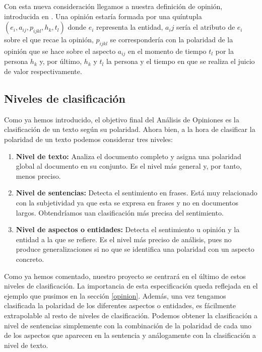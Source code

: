 	Con esta nueva consideración llegamos a nuestra definición de opinión, introducida en \cite{liu}. Una opinión estaría formada por una quíntupla $(e_i, a_{ij}, p_{ijkl}, h_{k}, t_{l})$ donde $e_i$ representa la entidad, $a_ij$ sería el atributo de $e_i$ sobre el que recae la opinión, $p_{ijkl}$ se correspondería con la polaridad de la opinión que se hace sobre el aspecto $a_{ij}$ en el momento de tiempo $t_{l}$ por la persona $h_{k}$ y, por último, $h_{k}$ y $t_{l}$ la persona y el tiempo en que se realiza el juicio de valor respectivamente.
		 
		
	\subsection{Niveles de clasificación}\label{nivelesSA}
	
	
	Como ya hemos introducido, el objetivo final del Análisis de Opiniones es la clasificación de un texto según su polaridad. Ahora bien, a la hora de clasificar la polaridad de un texto podemos considerar tres niveles:
	
	\begin{enumerate}
		\item \textbf{Nivel de texto: } Analiza el documento completo y asigna una polaridad global al documento en su conjunto. Es el nivel más general y, por tanto, menos preciso.
		\item \textbf{Nivel de sentencias: } Detecta el sentimiento en frases. Está muy relacionado con la subjetividad ya que esta se expresa en frases y no en documentos largos. Obtendríamos uan clasificación más precisa del sentimiento.
		\item \textbf{Nivel de aspectos o entidades: } Detecta el sentimiento u opinión y la entidad a la que se refiere. Es el nivel más preciso de análisis, pues no produce generalizaciones si no que se identifica una polaridad con un aspecto concreto.
	\end{enumerate}
	
	 Como ya hemos comentado, nuestro proyecto se centrará en el último de estos niveles de clasificación. La importancia de esta especificación queda reflejada en el ejemplo que pusimos en la sección \ref{opinion}. Además, una vez tengamos clasificada la polaridad de los diferentes aspectos o entidades, es fácilmente extrapolable al resto de niveles de clasificación. Podemos obtener la clasificación a nivel de sentencias simplemente con la combinación de la polaridad de cada uno de los aspectos que aparecen en la sentencia y análogamente con la clasificación a nivel de texto.